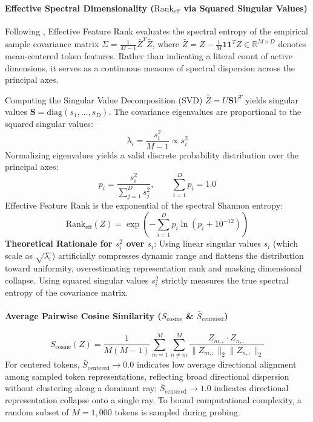 \documentclass{article}
\begin{document}
\paragraph{Effective Spectral Dimensionality ($\text{Rank}_{\text{eff}}$ via Squared Singular Values)}
Following \citet{roy2007effective}, Effective Feature Rank evaluates the spectral entropy of the empirical sample covariance matrix $\Sigma = \frac{1}{M - 1} \bar{Z}^T \bar{Z}$, where $\bar{Z} = Z - \frac{1}{M} \mathbf{1} \mathbf{1}^T Z \in \mathbb{R}^{M \times D}$ denotes mean-centered token features. Rather than indicating a literal count of active dimensions, it serves as a continuous measure of spectral dispersion across the principal axes.

Computing the Singular Value Decomposition (SVD) $\bar{Z} = U \mathbf{S} V^T$ yields singular values $\mathbf{S} = \text{diag}(s_1, \dots, s_D)$. The covariance eigenvalues are proportional to the squared singular values:
\begin{equation}
    \lambda_i = \frac{s_i^2}{M - 1} \propto s_i^2
\end{equation}
Normalizing eigenvalues yields a valid discrete probability distribution over the principal axes:
\begin{equation}
    p_i = \frac{s_i^2}{\sum_{j=1}^D s_j^2}, \qquad \sum_{i=1}^D p_i = 1.0
\end{equation}
Effective Feature Rank is the exponential of the spectral Shannon entropy:
\begin{equation}
    \text{Rank}_{\text{eff}}(Z) = \exp\left( - \sum_{i=1}^D p_i \ln(p_i + 10^{-12}) \right)
\end{equation}
\textbf{Theoretical Rationale for $s_i^2$ over $s_i$}: Using linear singular values $s_i$ (which scale as $\sqrt{\lambda_i}$) artificially compresses dynamic range and flattens the distribution toward uniformity, overestimating representation rank and masking dimensional collapse. Using squared singular values $s_i^2$ strictly measures the true spectral entropy of the covariance matrix.

\paragraph{Average Pairwise Cosine Similarity ($S_{\text{cosine}}$ \& $\bar{S}_{\text{centered}}$)}
\begin{equation}
    S_{\text{cosine}}(Z) = \frac{1}{M(M - 1)} \sum_{m=1}^M \sum_{n \neq m}^M \frac{Z_{m, :} \cdot Z_{n, :}}{\|Z_{m, :}\|_2 \|Z_{n, :}\|_2}
\end{equation}
For centered tokens, $\bar{S}_{\text{centered}} \to 0.0$ indicates low average directional alignment among sampled token representations, reflecting broad directional dispersion without clustering along a dominant ray; $\bar{S}_{\text{centered}} \to 1.0$ indicates directional representation collapse onto a single ray. To bound computational complexity, a random subset of $M = 1,000$ tokens is sampled during probing.
\end{document}
